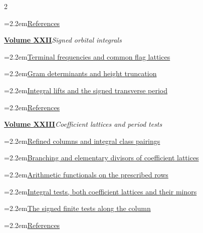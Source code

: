 \documentclass[a4paper,11pt]{article}
\theoremstyle{definition}
\theoremstyle{remark}
\numberwithin{equation}{section}
\begin{document}
\begin{multicols}{2}
\begin{minipage}{\linewidth}
\noindent\hangindent=2.2em\hyperref[nav:bibliography-XXI]{References}\par
\end{minipage}\par\medskip
\noindent\begin{minipage}{\linewidth}\raggedright
\textbf{\hyperref[nav:volume-XXII]{Volume XXII}}\enspace\emph{Signed orbital integrals}\par\smallskip
\noindent\hangindent=2.2em\hyperref[nav:chapter-ordinary-terminal-lattices]{Terminal frequencies and common flag lattices}\par
\noindent\hangindent=2.2em\hyperref[nav:chapter-transverse-determinants]{Gram determinants and height truncation}\par
\noindent\hangindent=2.2em\hyperref[nav:chapter-signed-transverse-integrals]{Integral lifts and the signed transverse period}\par
\noindent\hangindent=2.2em\hyperref[nav:bibliography-XXII]{References}\par
\end{minipage}\par\medskip
\noindent\begin{minipage}{\linewidth}\raggedright
\textbf{\hyperref[nav:volume-XXIII]{Volume XXIII}}\enspace\emph{Coefficient lattices and period tests}\par\smallskip
\noindent\hangindent=2.2em\hyperref[nav:chapter-refined-rational-columns]{Refined columns and integral class pairings}\par
\noindent\hangindent=2.2em\hyperref[nav:chapter-coefficient-weyl-lattices]{Branching and elementary divisors of coefficient lattices}\par
\noindent\hangindent=2.2em\hyperref[nav:g-XII-0]{Arithmetic functionals on the prescribed rows}\par
\noindent\hangindent=2.2em\hyperref[nav:g-XII-1]{Integral tests, both coefficient lattices and their minors}\par
\noindent\hangindent=2.2em\hyperref[nav:g-XII-2]{The signed finite tests along the column}\par
\noindent\hangindent=2.2em\hyperref[nav:bibliography-XXIII]{References}\par

\end{minipage}
\end{multicols}
\end{document}
